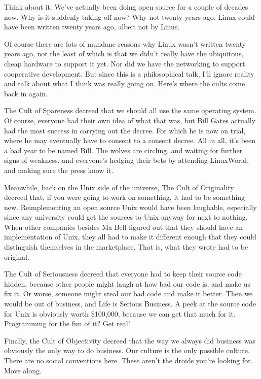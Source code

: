 Think about it. We've actually been doing open source for a couple of decades
now. Why is it suddenly taking off now? Why not twenty years ago. Linux could
have been written twenty years ago, albeit not by Linus.

Of course there are lots of mundane reasons why Linux wasn't written twenty
years ago, not the least of which is that we didn't really have the
ubiquitous, cheap hardware to support it yet. Nor did we have the networking
to support cooperative development. But since this is a philosophical talk,
I'll ignore reality and talk about what I think was really going on. Here's
where the cults come back in again.

The Cult of Spareness decreed that we should all use the same operating
system. Of course, everyone had their own idea of what that was, but Bill
Gates actually had the most success in carrying out the decree. For which he
is now on trial, where he may eventually have to consent to a consent decree.
All in all, it's been a bad year to be named Bill. The wolves are circling,
and waiting for further signs of weakness, and everyone's hedging their bets
by attending LinuxWorld, and making sure the press know it.

Meanwhile, back on the Unix side of the universe, The Cult of Originality
decreed that, if you were going to work on something, it had to be something
new. Reimplementing an open source Unix would have been laughable, especially
since any university could get the sources to Unix anyway for next to
nothing. When other companies besides Ma Bell figured out that they should
have an implementation of Unix, they all had to make it different enough that
they could distinguish themselves in the marketplace. That is, what they
wrote had to be original.

The Cult of Seriousness decreed that everyone had to keep their source code
hidden, because other people might laugh at how bad our code is, and make us
fix it. Or worse, someone might steal our bad code and make it better. Then
we would be out of business, and Life is Serious Business. A peek at the
source code for Unix is obviously worth \$100,000, because we can get that
much for it. Programming for the fun of it? Get real!

Finally, the Cult of Objectivity decreed that the way we always did business
was obviously the only way to do business. Our culture is the only possible
culture. There are no social conventions here. These aren't the droids you're
looking for. Move along.

